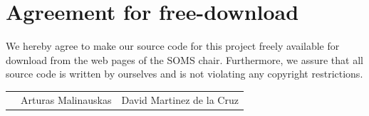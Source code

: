 \documentclass[12pt]{article}
\begin{document}

\newpage


\newpage
\section*{Agreement for free-download}
\bigskip


\bigskip


\large We hereby agree to make our source code for this project freely available for download from the web pages of the SOMS chair. Furthermore, we assure that all source code is written by ourselves and is not violating any copyright restrictions.

\begin{center}

\bigskip


\bigskip


\begin{tabular}{@{}p{3.3cm}@{}p{6cm}@{}@{}p{6cm}@{}}
\begin{minipage}{3cm}

\end{minipage}
&
\begin{minipage}{6cm}
\vspace{2mm} \large Arturas Malinauskas

 \vspace{\baselineskip}

\end{minipage}
&
\begin{minipage}{6cm}

\large David Martinez de la Cruz

\end{minipage}
\end{tabular}


\end{center}
\newpage







\tableofcontents

\newpage
\end{document}
